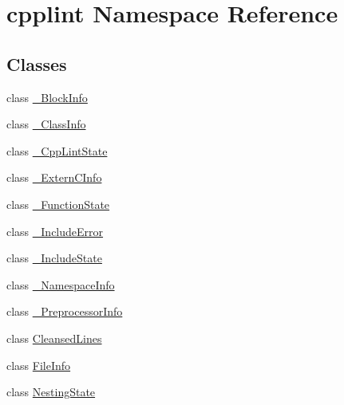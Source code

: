 \hypertarget{namespacecpplint}{}\section{cpplint Namespace Reference}
\label{namespacecpplint}
\subsection*{Classes}
\begin{DoxyCompactItemize}
\item 
class \hyperlink{classcpplint_1_1__BlockInfo}{\+\_\+\+Block\+Info}
\item 
class \hyperlink{classcpplint_1_1__ClassInfo}{\+\_\+\+Class\+Info}
\item 
class \hyperlink{classcpplint_1_1__CppLintState}{\+\_\+\+Cpp\+Lint\+State}
\item 
class \hyperlink{classcpplint_1_1__ExternCInfo}{\+\_\+\+Extern\+C\+Info}
\item 
class \hyperlink{classcpplint_1_1__FunctionState}{\+\_\+\+Function\+State}
\item 
class \hyperlink{classcpplint_1_1__IncludeError}{\+\_\+\+Include\+Error}
\item 
class \hyperlink{classcpplint_1_1__IncludeState}{\+\_\+\+Include\+State}
\item 
class \hyperlink{classcpplint_1_1__NamespaceInfo}{\+\_\+\+Namespace\+Info}
\item 
class \hyperlink{classcpplint_1_1__PreprocessorInfo}{\+\_\+\+Preprocessor\+Info}
\item 
class \hyperlink{classcpplint_1_1CleansedLines}{Cleansed\+Lines}
\item 
class \hyperlink{classcpplint_1_1FileInfo}{File\+Info}
\item 
class \hyperlink{classcpplint_1_1NestingState}{Nesting\+State}
\end{DoxyCompactItemize}
